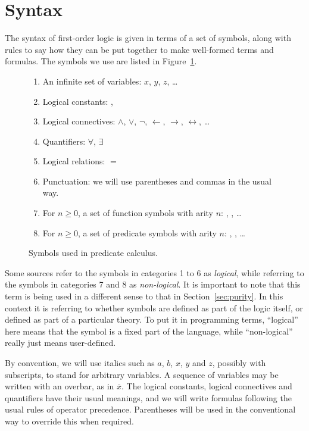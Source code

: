 \section{Syntax}
\label{sec:syntax}

The syntax of first-order logic is given in terms of a set of symbols,
along with rules to say how they can be put together
to make well-formed terms and formulas.
The symbols we use are listed in Figure~\ref{fig:symbols}.

\begin{figure}
\begin{enumerate}
\item
An infinite set of variables:
$x$, $y$, $z$, \ldots{}
\item
Logical constants:
\true, \false
\item
Logical connectives:
$\land$, $\lor$, $\lnot$, $\leftarrow$, $\rightarrow$,
$\leftrightarrow$, \ldots
\item
Quantifiers:
$\forall$, $\exists$
\item
Logical relations: $=$
\item
Punctuation: we will use parentheses and commas in the usual way.
\item
For $n \geqslant 0$,
a set of function symbols with arity $n$:
, , \ldots
\item
For $n \geqslant 0$,
a set of predicate symbols with arity $n$:
, , \ldots
\end{enumerate}
\caption{Symbols used in predicate calculus.\label{fig:symbols}}
\end{figure}

Some sources refer to the symbols in categories 1 to 6
as \emph{logical},
while referring to the symbols in categories 7 and 8 as
\emph{non-logical\label{gi:non-logical2}}.
It is important to note that
this term is being used in a different sense
to that in Section~\ref{sec:purity}.
In this context it is referring to whether symbols are
defined as part of the logic itself,
or defined as part of a particular theory.
To put it in programming terms,
``logical'' here means that
the symbol is a fixed part of the language,
while ``non-logical'' really just means user-defined.

By convention,
we will use italics such as $a$, $b$, $x$, $y$ and $z$,
possibly with subscripts,
to stand for arbitrary variables.
A sequence of variables may be written with an overbar,
as in $\bar{x}$.
The logical constants, logical connectives and quantifiers
have their usual meanings,
and we will write formulas following
the usual rules of operator precedence.
Parentheses will be used in the conventional way
to override this when required.


